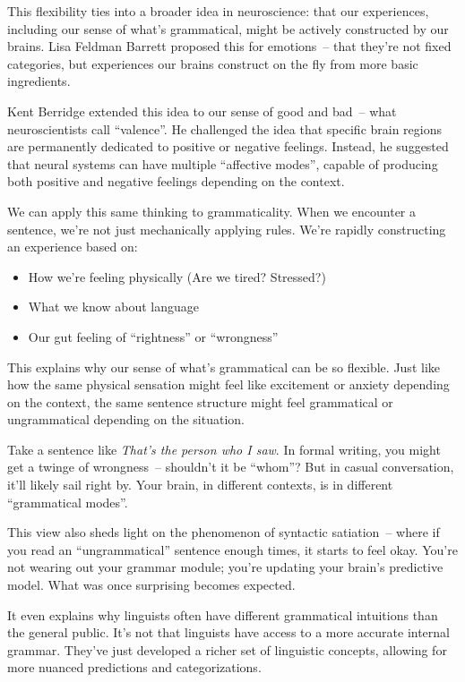 This flexibility ties into a broader idea in neuroscience: that our experiences, including our sense of what's grammatical, might be actively constructed by our brains. Lisa Feldman Barrett proposed this for emotions~-- that they're not fixed categories, but experiences our brains construct on the fly from more basic ingredients.

Kent Berridge extended this idea to our sense of good and bad~-- what neuroscientists call ``valence''. He challenged the idea that specific brain regions are permanently dedicated to positive or negative feelings. Instead, he suggested that neural systems can have multiple ``affective modes'', capable of producing both positive and negative feelings depending on the context.

We can apply this same thinking to grammaticality. When we encounter a sentence, we're not just mechanically applying rules. We're rapidly constructing an experience based on:

\begin{itemize}
    \item How we're feeling physically (Are we tired? Stressed?)
    \item What we know about language
    \item Our gut feeling of ``rightness'' or ``wrongness''
\end{itemize}

This explains why our sense of what's grammatical can be so flexible. Just like how the same physical sensation might feel like excitement or anxiety depending on the context, the same sentence structure might feel grammatical or ungrammatical depending on the situation.

Take a sentence like \textit{That's the person who I saw}. In formal writing, you might get a twinge of wrongness~-- shouldn't it be ``whom''? But in casual conversation, it'll likely sail right by. Your brain, in different contexts, is in different ``grammatical modes''.

This view also sheds light on the phenomenon of syntactic satiation~-- where if you read an ``ungrammatical'' sentence enough times, it starts to feel okay. You're not wearing out your grammar module; you're updating your brain's predictive model. What was once surprising becomes expected.

It even explains why linguists often have different grammatical intuitions than the general public. It's not that linguists have access to a more accurate internal grammar. They've just developed a richer set of linguistic concepts, allowing for more nuanced predictions and categorizations.

